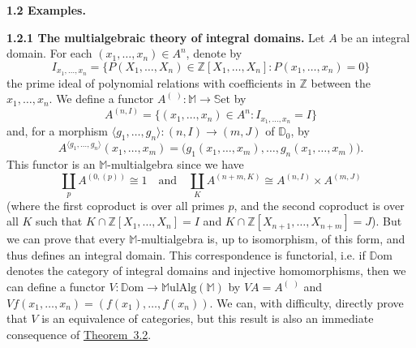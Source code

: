 \documentclass{article}
\newenvironment{rmenv}[1]
  {\phantomsection\par\medskip\noindent\textbf{#1.}\rmfamily}
  {\medskip}
\newcommand{\bb}[1]{{\mathbb{#1}}}
\newcommand{\Set}{\mathbb{S}\mathrm{et}}
\newcommand{\MulAlg}{\mathbb{M}\mathrm{ulAlg}}
\newcommand{\Dom}{\mathbb{D}\mathrm{om}}
\newcommand{\oldpage}[1]{\marginpar{\footnotesize$\Big\vert$ \textit{p.~#1}}}
\begin{document}
\begin{rmenv}{1.2 Examples}
\begin{rmenv}{1.2.1 The multialgebraic theory of integral domains}
\oldpage{195}
    Let $A$ be an integral domain.
    For each $(x_1,\ldots,x_n)\in A^n$, denote by
    \[
      I_{x_1,\ldots,x_n} =
      \big\{
        P(X_1,\ldots,X_n)\in\bb{Z}[X_1,\ldots,X_n]
        :
        P(x_1,\ldots,x_n)=0
      \big\}
    \]
    the prime ideal of polynomial relations with coefficients in $\bb{Z}$ between the $x_1,\ldots,x_n$.
    We define a functor $A^{(\,\,)}\colon\bb{M}\to\Set$ by
    \[
      A^{(n,I)}=\{(x_1,\ldots,x_n)\in A^n:I_{x_1,\ldots,x_n}=I\}
    \]
    and, for a morphism $\langle g_1,\ldots,g_n\rangle\colon(n,I)\to(m,J)$ of $\bb{D}_0$, by
    \[
      A^{\langle g_1,\ldots,g_n\rangle}(x_1,\ldots,x_m) =
      \big(
        g_1(x_1,\ldots,x_m),
        \ldots,
        g_n(x_1,\ldots,x_m)
      \big).
    \]
    This functor is an $\bb{M}$-multialgebra since we have
    \[
      \coprod_p A^{(0,(p))} \cong 1
      \quad\text{and}\quad
      \coprod_K A^{(n+m,K)} \cong A^{(n,I)}\times A^{(m,J)}
    \]
    (where the first coproduct is over all primes $p$, and the second coproduct is over all $K$ such that $K\cap\bb{Z}[X_1,\ldots,X_n] = I$ and $K\cap\bb{Z}[X_{n+1},\ldots,X_{n+m}] = J$).
    But we can prove that every $\bb{M}$-multialgebra is, up to isomorphism, of this form, and thus defines an integral domain.
    This correspondence is functorial, i.e. if $\Dom$ denotes the category of integral domains and injective homomorphisms, then we can define a functor $V\colon\Dom\to\MulAlg(\bb{M})$ by $VA=A^{(\,\,)}$ and $Vf(x_1,\ldots,x_n)=(f(x_1),\ldots,f(x_n))$.
    We can, with difficulty, directly prove that $V$ is an equivalence of categories, but this result is also an immediate consequence of \hyperref[3.2]{Theorem~3.2}.
  \end{rmenv}


\end{rmenv}
\end{document}
